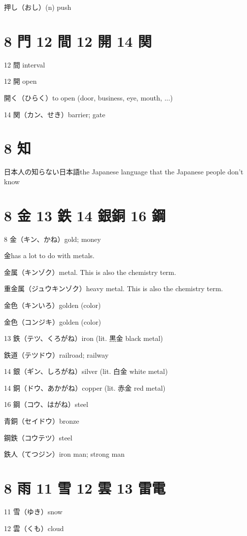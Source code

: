 押し（おし）(n) push

\section{8 門 12 間 12 開 14 関}

12 間 interval

12 開 open

開く（ひらく）to open (door, business, eye, mouth, ...)

14 関（カン、せき）barrier; gate

\section{8 知}

日本人の知らない日本語the Japanese language that the Japanese people don't know

\section{8 金 13 鉄 14 銀銅 16 鋼}

8 金（キン、かね）gold; money

金has a lot to do with metals.

金属（キンゾク）metal. This is also the chemistry term.

重金属（ジュウキンゾク）heavy metal. This is also the chemistry term.

金色（キンいろ）golden (color)

金色（コンジキ）golden (color)

13 鉄（テツ、くろがね）iron (lit. 黒金 black metal)

鉄道（テツドウ）railroad; railway

14 銀（ギン、しろがね）silver (lit. 白金 white metal)

14 銅（ドウ、あかがね）copper (lit. 赤金 red metal)

16 鋼（コウ、はがね）steel

青銅（セイドウ）bronze

鋼鉄（コウテツ）steel

鉄人（てつジン）iron man; strong man

\section{8 雨 11 雪 12 雲 13 雷電}

11 雪（ゆき）snow

12 雲（くも）cloud

